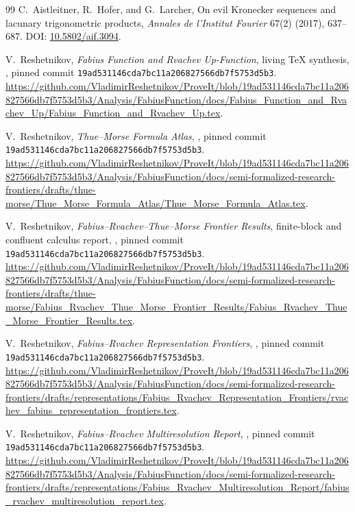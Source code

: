 \documentclass[11pt]{article}
\theoremstyle{definition}
\theoremstyle{remark}
\begin{document}
\begin{thebibliography}{99}
C.~Aistleitner, R.~Hofer, and G.~Larcher,
\newblock On evil Kronecker sequences and lacunary trigonometric products,
\newblock \emph{Annales de l'Institut Fourier} 67(2) (2017), 637--687.
\newblock DOI: \href{https://doi.org/10.5802/aif.3094}{10.5802/aif.3094}.

V.~Reshetnikov,
\newblock \emph{Fabius Function and Rvachev Up-Function}, living TeX synthesis,
\newblock \repo, pinned commit
\nolinkurl{19ad531146cda7bc11a206827566db7f5753d5b3}.
\newblock \url{https://github.com/VladimirReshetnikov/ProveIt/blob/19ad531146cda7bc11a206827566db7f5753d5b3/Analysis/FabiusFunction/docs/Fabius_Function_and_Rvachev_Up/Fabius_Function_and_Rvachev_Up.tex}.

V.~Reshetnikov,
\newblock \emph{Thue--Morse Formula Atlas},
\newblock \repo, pinned commit
\nolinkurl{19ad531146cda7bc11a206827566db7f5753d5b3}.
\newblock \url{https://github.com/VladimirReshetnikov/ProveIt/blob/19ad531146cda7bc11a206827566db7f5753d5b3/Analysis/FabiusFunction/docs/semi-formalized-research-frontiers/drafts/thue-morse/Thue_Morse_Formula_Atlas/Thue_Morse_Formula_Atlas.tex}.

V.~Reshetnikov,
\newblock \emph{Fabius--Rvachev--Thue--Morse Frontier Results}, finite-block and
confluent calculus report,
\newblock \repo, pinned commit
\nolinkurl{19ad531146cda7bc11a206827566db7f5753d5b3}.
\newblock \url{https://github.com/VladimirReshetnikov/ProveIt/blob/19ad531146cda7bc11a206827566db7f5753d5b3/Analysis/FabiusFunction/docs/semi-formalized-research-frontiers/drafts/thue-morse/Fabius_Rvachev_Thue_Morse_Frontier_Results/Fabius_Rvachev_Thue_Morse_Frontier_Results.tex}.

V.~Reshetnikov,
\newblock \emph{Fabius--Rvachev Representation Frontiers},
\newblock \repo, pinned commit
\nolinkurl{19ad531146cda7bc11a206827566db7f5753d5b3}.
\newblock \url{https://github.com/VladimirReshetnikov/ProveIt/blob/19ad531146cda7bc11a206827566db7f5753d5b3/Analysis/FabiusFunction/docs/semi-formalized-research-frontiers/drafts/representations/Fabius_Rvachev_Representation_Frontiers/rvachev_fabius_representation_frontiers.tex}.

V.~Reshetnikov,
\newblock \emph{Fabius--Rvachev Multiresolution Report},
\newblock \repo, pinned commit
\nolinkurl{19ad531146cda7bc11a206827566db7f5753d5b3}.
\newblock \url{https://github.com/VladimirReshetnikov/ProveIt/blob/19ad531146cda7bc11a206827566db7f5753d5b3/Analysis/FabiusFunction/docs/semi-formalized-research-frontiers/drafts/representations/Fabius_Rvachev_Multiresolution_Report/fabius_rvachev_multiresolution_report.tex}.


\end{thebibliography}
\end{document}
